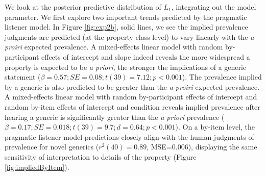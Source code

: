\documentclass[12pt,letterpaper]{article}
\newcommand{\ndg}[1]{\textcolor{Green}{[ndg: #1]}}
\newcommand{\mht}[1]{\textcolor{Blue}{[mht: #1]}}
\begin{document}
We look at the posterior predictive distribution of $L_1$, integrating out the model parameter.
We first explore two important trends predicted by the pragmatic listener model.
In Figure \ref{fig:exp2b}, solid lines, we see the implied prevalence judgments are predicted (at the property class level) to vary linearly with the \emph{a proiri} expected prevalence. 
A mixed-effects linear model with random by-participant effects of intercept and slope indeed reveals the more widespread a property is expected to be \emph{a priori}, the stronger the implications of a generic statement ($\beta = 0.57; SE = 0.08; t(39) = 7.12; p < 0.001$).
The prevalence implied by a generic is also predicted to be greater than the \emph{a proiri} expected prevalence.
A mixed-effects linear model with random by-participant effects of intercept and random by-item effects of intercept and condition reveals implied prevalence after hearing a generic is significantly greater than the \emph{a priori} prevalence ($\beta = 0.17; SE = 0.018; t(39) = 9.7; d = 0.64; p < 0.001$).
On a by-item level, the pragmatic listener model predictions closely align with the human judgments of prevalence for novel generics ($r^2(40)=0.89$, MSE=0.006), displaying the same sensitivity of interpretation to details of the property (Figure \ref{fig:impliedByItem}). 





\end{document}
